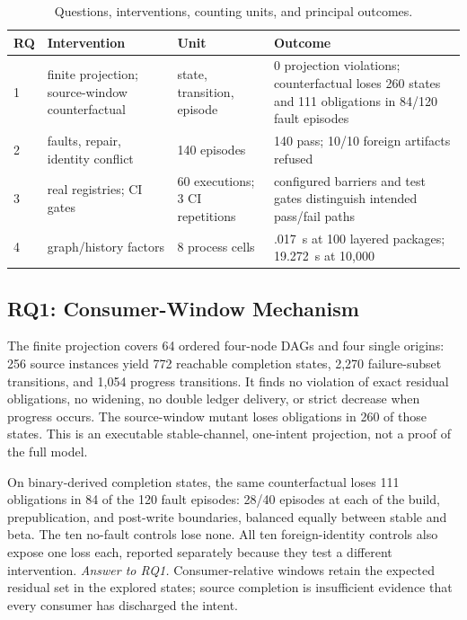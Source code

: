 \begin{table}[t]
\centering
\caption{Questions, interventions, counting units, and principal outcomes.}
\label{tab:rqs}
\scriptsize
\setlength{\tabcolsep}{2pt}
\begin{tabular}{@{}lp{1.65cm}p{1.45cm}p{3.65cm}@{}}
\toprule
RQ & Intervention & Unit & Outcome \\
\midrule
1 & finite projection; source-window counterfactual & state, transition,
episode & 0 projection violations; counterfactual loses 260 states and
111 obligations in 84/120 fault episodes \\
2 & faults, repair, identity conflict & 140 episodes & 140 pass; 10/10
foreign artifacts refused \\
3 & real registries; CI gates & 60 executions; 3 CI repetitions & configured
barriers and test gates distinguish intended pass/fail paths \\
4 & graph/history factors & 8 process cells & .017~s at 100 layered packages;
19.272~s at 10,000 \\
\bottomrule
\end{tabular}
\end{table}

\subsection{RQ1: Consumer-Window Mechanism}
The finite projection covers 64 ordered four-node DAGs and four single origins:
256 source instances yield 772 reachable completion states, 2,270
failure-subset transitions, and 1,054 progress transitions. It finds no
violation of exact residual obligations, no widening, no double ledger
delivery, or strict decrease when progress occurs. The source-window mutant
loses obligations in 260 of those states. This is an executable stable-channel,
one-intent projection, not a proof of the full model.

On binary-derived completion states, the same counterfactual loses 111
obligations in 84 of the 120 fault episodes: 28/40 episodes at each of the
build, prepublication, and post-write boundaries, balanced equally between
stable and beta. The ten no-fault controls lose none. All ten foreign-identity
controls also expose one loss each, reported separately because they test a
different intervention. \emph{Answer to RQ1.} Consumer-relative windows retain
the expected residual set in the explored states; source completion is
insufficient evidence that every consumer has discharged the intent.

